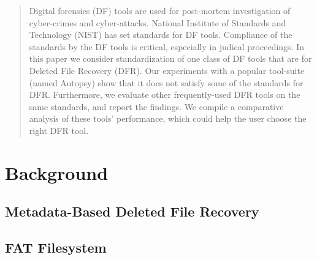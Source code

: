 \documentclass{mcurcsm}
\begin{document}

\maketitle
\begin{abstract}
Digital forensics (DF) tools are used for post-mortem investigation of cyber-crimes and cyber-attacks. 
National Institute of Standards and Technology (NIST) 
has set standards for DF tools. Compliance of the standards by the DF tools is critical, especially in judical proceedings. 
In this paper we consider standardization of one class of DF tools that are for Deleted File Recovery (DFR). 
Our experiments with a popular tool-suite (named Autopsy) show that it does not satisfy some of the standards for DFR. 
Furthermore, we evaluate other frequently-used DFR tools on the same standards, and report the findings.  
We compile a comparative analysis of these tools' performance, which could help the user choose the right DFR tool. 
\end{abstract}





\section{Background}

\subsection{Metadata-Based Deleted File Recovery}

\subsection{FAT Filesystem}
\end{document}
